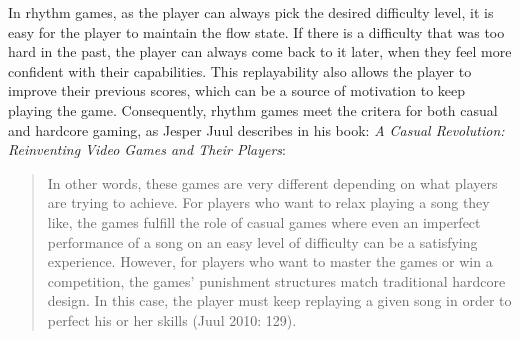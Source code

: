 In rhythm games, as the player can always pick the desired difficulty level, it is easy for the player to maintain the flow state. If there is a difficulty that was too hard in the past, the player can always come back to it later, when they feel more confident with their capabilities. This replayability also allows the player to improve their previous scores, which can be a source of motivation to keep playing the game. Consequently, rhythm games meet the critera for both casual and hardcore gaming, as Jesper Juul describes in his book: \textit{A Casual Revolution: Reinventing Video Games and Their Players}\cite{casualrevolution}:
\begin{quote}
    In other words, these games are very different depending on what players are trying to achieve. For players who want to relax playing a song they like, the games fulfill the role of casual games where even an imperfect performance of a song on an easy level of difficulty can be a satisfying experience. However, for players who want to master the games or win a competition, the games’ punishment structures match traditional hardcore design. In this case, the player must keep replaying a given song in order to perfect his or her skills (Juul 2010: 129).
\end{quote}

